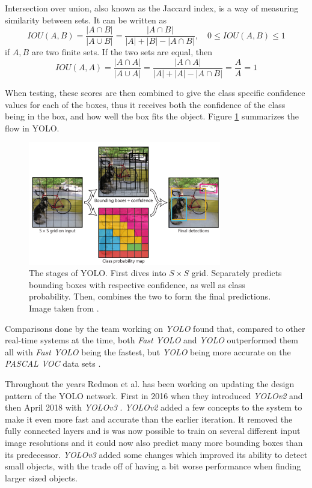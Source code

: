  Intersection over union, also known as the Jaccard index, is a way of measuring similarity between sets. It can be written as 
 \[
IOU(A,B) =  \frac{|A\cap B |}{|A\cup B|} =\frac{|A\cap B|}{|A| + |B| - |A \cap B|}
, \quad 0\leq IOU(A,B) \leq 1
 \]
 if $A,B$ are two finite sets. If the two sets are equal, then \[ IOU(A,A) =  \frac{|A\cap A |}{|A\cup A|} = \frac{|A\cap A|}{|A| + |A| - |A \cap B|}  = \frac{A}{A} = 1 \]
 
 When testing, these scores are then combined to give the class specific confidence values for each of the boxes, thus it receives both the confidence of the class being in the box, and how well the box fits the object. Figure \ref{fig:YOLO_stages} summarizes the flow in YOLO. 
\begin{figure}[hbtp]
\begin{center}
\includegraphics[width = 0.75\textwidth]{./Images/YOLO_stages.PNG} 
\caption{The stages of YOLO. First dives into $S \times S$ grid. Separately predicts bounding boxes with respective confidence, as well as class probability. Then, combines the two to form the final predictions. Image taken from \cite{YOLO1}.}
\label{fig:YOLO_stages}
\end{center}
\end{figure}

Comparisons done by the team working on \textit{YOLO} found that, compared to other real-time systems at the time, both \textit{Fast YOLO} and \textit{YOLO} outperformed them all with \textit{Fast YOLO} being the fastest, but \textit{YOLO} being more accurate on the \textit{PASCAL VOC} data sets \cite{PASCAL}.

Throughout the years Redmon et al. has been working on updating the design pattern of the 
YOLO network. First in 2016 when they introduced \textit{YOLOv2} and then April 2018 with \textit{YOLOv3} \cite{YOLO2}\cite{YOLO3}. \textit{YOLOv2} added a few concepts to the system to make it even more fast and accurate than the earlier iteration. It removed the fully connected layers and is was now possible to train on several different input image resolutions and it could now also predict many more bounding boxes than its predecessor. \textit{YOLOv3} added some changes which improved its ability to detect small objects, with the trade off of having a bit worse performance when finding larger sized objects.  

